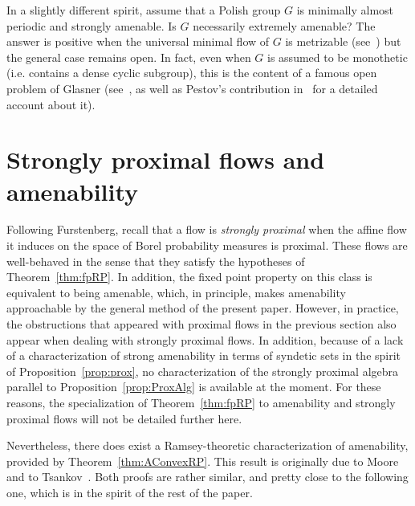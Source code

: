 In a slightly different spirit, assume that a Polish group $G$ is minimally almost periodic and strongly amenable. Is $G$ necessarily extremely amenable? The answer is positive when the universal minimal flow of $G$ is metrizable (see~\cite{NVT8}) but the general case remains open. In fact, even when $G$ is assumed to be monothetic (i.e. contains a dense cyclic subgroup), this is the content of a famous open problem of Glasner (see~\cite{Gl1}, as well as Pestov's contribution in~\cite{OT} for a detailed account about it).

\section{Strongly proximal flows and amenability}
\label{section:stronglyproximal}

Following Furstenberg, recall that a flow is \emph{strongly proximal} when the affine flow it induces on the space of Borel probability measures is proximal. These flows are well-behaved in the sense that they satisfy the hypotheses of Theorem~\ref{thm:fpRP}. In addition, the fixed point property on this class is equivalent to being amenable, which, in principle, makes amenability approachable by the general method of the present paper. However, in practice, the obstructions that appeared with proximal flows in the previous section also appear when dealing with strongly proximal flows. In addition, because of a lack of a characterization of strong amenability in terms of syndetic sets in the spirit of Proposition~\ref{prop:prox}, no characterization of the strongly proximal algebra parallel to Proposition~\ref{prop:ProxAlg} is available at the moment. For these reasons, the specialization of Theorem~\ref{thm:fpRP} to amenability and strongly proximal flows will not be detailed further here.

Nevertheless, there does exist a Ramsey-theoretic characterization of amenability, provided by Theorem~\ref{thm:AConvexRP}. This result is originally due to Moore~\cite{M} and to Tsankov~\cite{Ts1}. Both proofs are rather similar, and pretty close to the following one, which is in the spirit of the rest of the paper.

